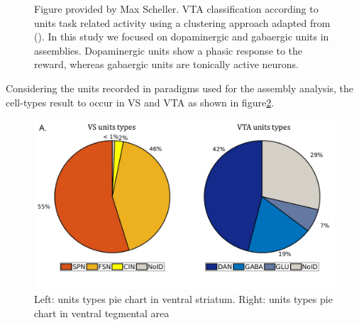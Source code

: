 \begin{figure}
   \caption{Figure provided by Max Scheller. VTA classification according to units task related activity using a clustering approach adapted from (\cite{Uchida}). In this study we focused on dopaminergic and gabaergic units in assemblies. Dopaminergic units show a phasic response to the reward, whereas gabaergic units are tonically active neurons.}
    \label{fig:ClassificatonVTA}
\end{figure}
Considering the units recorded in paradigms used for the assembly analysis, the cell-types result to occur in VS and VTA as shown in figure\ref{fig:PieRegions}.
\begin{figure}
  \centering
    \includegraphics[scale=0.5]{figures/PieRegions1.pdf}
   \caption{Left: units types pie chart in ventral striatum. Right: units types pie chart in ventral tegmental area}
    \label{fig:PieRegions}
\end{figure}

